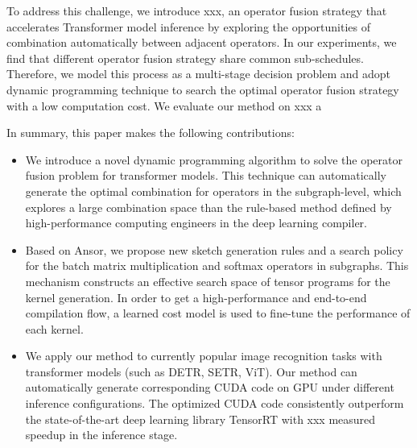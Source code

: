 To address this challenge, we introduce xxx, an operator fusion strategy that accelerates Transformer model inference by exploring the opportunities of combination automatically between adjacent operators. In our experiments, we find that different operator fusion strategy share
common sub-schedules. Therefore, we model this process as a multi-stage decision problem and adopt dynamic programming technique to search the 
optimal operator fusion strategy with a low computation cost. We evaluate our method on xxx a

In summary, this paper makes the following contributions:
\begin{itemize}
  \item We introduce a novel dynamic programming algorithm to solve the operator fusion problem for transformer models. This technique can automatically generate the optimal combination for operators in the subgraph-level, which explores a large combination space than the rule-based method defined by high-performance computing engineers in the deep learning compiler.
  \item Based on Ansor, we propose new sketch generation rules and a search policy for the batch matrix multiplication and softmax operators in subgraphs. This mechanism constructs an effective search space of tensor programs for the kernel generation. In order to get a high-performance and end-to-end compilation flow, a learned cost model is used to fine-tune the performance of each kernel.
  \item We apply our method to currently popular image recognition tasks with transformer models (such as DETR, SETR, ViT). Our method can automatically generate corresponding CUDA code on GPU under different inference configurations.
  The optimized CUDA code consistently outperform the state-of-the-art deep learning library TensorRT with xxx measured speedup in the 
  inference stage.
\end{itemize}

\label{sec:intro}


